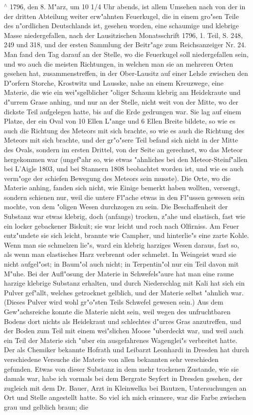 \documentclass[a4paper, 11pt, oneside, polutonikogreek, german]{article}
\begin{document}
$^\wedge$ 1796, den 8. M"arz, um 10 1/4 Uhr abends, ist allem Umsehen nach von der in der dritten Abteilung weiter erw"ahnten Feuerkugel, die in einem gro"sen Teile des n"ordlichen Deutschlands ist, gesehen worden, eine schaumige und klebrige Masse niedergefallen, nach der Lausitzischen Monatsschrift 1796, 1. Teil, S. 248, 249 und 318, und der ersten Sammlung der Beitr"age zum Reichsanzeiger Nr. 24. Man fand den Tag darauf an der Stelle, wo die Feuerkugel soll niedergefallen sein, und wo auch die meisten Richtungen, in welchen man sie an mehreren Orten gesehen hat, zusammenstreffen, in der Ober-Lausitz auf einer Lehde zwischen den D"orfern Storche, Krostwitz und Lausske, nahe an einem Kreuzwege, eine Materie, die wie ein wei"sgelblicher "oliger Schaum klebrig am Heidekraute und d"urrem Grase anhing, und nur an der Stelle, nicht weit von der Mitte, wo der dickste Teil aufgelegen hatte, bis auf die Erde gedrungen war. Sie lag auf einem Platze, der ein Oval von 10 Ellen L"ange und 6 Ellen Breite bildete, so wie es auch die Richtung des Meteors mit sich brachte, so wie es auch die Richtung des Meteors mit sich brachte, und der gr"o"sere Teil befand sich nicht in der Mitte des Ovals, sondern im ersten Drittel, von der Seite an gerechnet, wo das Meteor hergekommen war (ungef"ahr so, wie etwas "ahnliches bei den Meteor-Steinf"allen bei L'Aigle 1803, und bei Stannern 1808 beobachtet worden ist, und wie es auch verm"oge der schiefen Bewegung des Meteors sein musste). Die Orte, wo die Materie anhing, fanden sich nicht, wie Einige bemerkt haben wollten, versengt, sondern schienen nur, weil die untere Fl"ache etwas in den Fl"ussen gewesen sein mochte, von dem "oligen Wesen durchzogen zu sein. Die Beschaffenheit der Substanz war etwas klebrig, doch (anfangs) trocken, z"ahe und elastisch, fast wie ein locker gebackener Biskuit; sie war leicht und roch nach Olfirniss. Am Feuer entz"undete sie sich leicht, brannte wie Campher, und hinterlie"s eine zarte Kohle. Wenn man sie schmelzen lie"s, ward ein klebrig harziges Wesen daraus, fast so, als wenn man elastisches Harz verbrennt oder schmelzt. In Weingeist ward sie nicht aufgel"ost; in Baum"ol auch nicht; in Terpentin"ol nur ein Teil davon mit M"uhe. Bei der Aufl"osung der Materie in Schwefels"aure hat man eine raune harzige klebrige Substanz erhalten, und durch Niederschlag mit Kali hat sich ein Pulver gef"allt, welches getrocknet gelblich, und der Materie selbst "ahnlich war. (Dieses Pulver wird wohl gr"o"sten Teils Schwefel gewesen sein.) Aus dem Gew"achsreiche konnte die Materie nicht sein, weil wegen des unfruchtbaren Bodens dort nichts als Heidekraut und schlechtes d"urres Gras anzutreffen, und der Boden zum Teil mit einem wei"slichen Moose "uberdeckt war, und weil auch ein Teil der Materie sich "uber ein ausgefahrenes Wagenglei"s verbreitet hatte. Der als Chemiker bekannte Hofrath und Leibarzt Leonhardi in Dresden hat durch verschiedene Versuche die Materie von allen bekannten sehr verschieden gefunden. Etwas von dieser Substanz in dem mehr trockenen Zustande, wie sie damals war, habe ich vormals bei dem Bergrate Seyfert in Dresden gesehen, der zugleich mit dem Dr. Bauer, Arzt in Kleinwelka bei Bautzen, Untersuchungen an Ort und Stelle angestellt hatte. So viel ich mich erinnere, war die Farbe zwischen grau und gelblich braun; die 
\end{document}
